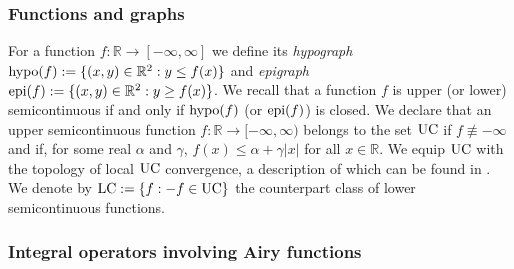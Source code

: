 \documentclass[oneside,final,11pt]{amsart}
\theoremstyle{definition}
\newcommand{\R}{\mathbb{R}}
\newcommand{\1}[1]{\mathbf{1}_{#1}}
\newcommand{\uptext}[1]{\text{\upshape{#1}}}
\DeclareMathOperator{\epi}{\uptext{epi}}
\DeclareMathOperator{\hypo}{\uptext{hypo}}
\DeclareMathOperator{\UC}{\uptext{UC}}
\DeclareMathOperator{\LC}{\uptext{LC}}
\numberwithin{equation}{section}
\begin{document}
\subsubsection{Functions and graphs}

For a function $f : \R \to [-\infty, \infty]$ we define its \emph{hypograph} $\hypo(f) := \{(x,y) \in \R^2: y \le f(x)\}$ and \emph{epigraph} $\epi(f) := \{(x,y) \in \R^2: y \ge f(x)\}$. We recall that a function $f$ is upper (or lower) semicontinuous if and only if $\hypo(f)$ (or $\epi(f)$) is closed.
We declare that an upper semicontinuous function $f : \R \to [-\infty, \infty)$ belongs to  the set $\UC$  if $f \not\equiv -\infty$ and if, for some real $\alpha$ and $\gamma$, $f(x) \leq \alpha + \gamma |x|$ for all $x\in \R$. We equip $\UC$ with the topology of local $\UC$ convergence, a description of which can be found in \cite[Section~3.1]{fixedpt}. We denote by  $\LC := \{f : -f \in \UC\}$  the counterpart class of lower semicontinuous functions.

\subsubsection{Integral operators involving Airy functions}%
\end{document}
